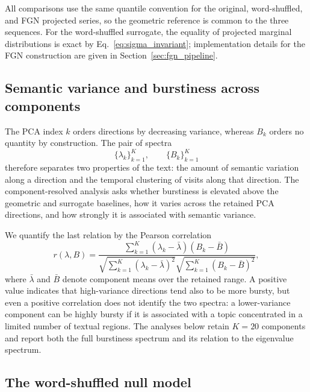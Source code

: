 \documentclass[12pt,a4paper]{article}
\begin{document}
All comparisons use the same quantile convention for the original,
word-shuffled, and FGN projected series, so the geometric reference is
common to the three sequences.
For the word-shuffled surrogate, the equality of projected marginal
distributions is exact by Eq.~\eqref{eq:sigma_invariant}; implementation
details for the FGN construction are given in
Section~\ref{sec:fgn_pipeline}.

\subsection{Semantic variance and burstiness across components}
\label{sec:component_structure}

The PCA index $k$ orders directions by decreasing variance, whereas
$B_k$ orders no quantity by construction.
The pair of spectra
\begin{equation}
  \{\lambda_k\}_{k=1}^K,
  \qquad
  \{B_k\}_{k=1}^K
  \label{eq:two_spectra}
\end{equation}
therefore separates two properties of the text: the amount of semantic
variation along a direction and the temporal clustering of visits along
that direction.
The component-resolved analysis asks whether burstiness is elevated
above the geometric and surrogate baselines, how it varies across the
retained PCA directions, and how strongly it is associated with
semantic variance.

We quantify the last relation by the Pearson correlation
\begin{equation}
  r(\lambda,B)=
  \frac{\sum_{k=1}^{K}(\lambda_k-\bar\lambda)(B_k-\bar B)}
  {\sqrt{\sum_{k=1}^{K}(\lambda_k-\bar\lambda)^2}
   \sqrt{\sum_{k=1}^{K}(B_k-\bar B)^2}},
  \label{eq:eigen_burst_corr}
\end{equation}
where $\bar\lambda$ and $\bar B$ denote component means over the retained
range.
A positive value indicates that high-variance directions tend also to
be more bursty, but even a positive correlation does not identify the
two spectra: a lower-variance component can be highly bursty if it is
associated with a topic concentrated in a limited number of textual
regions.
The analyses below retain $K=20$ components and report both the full
burstiness spectrum and its relation to the eigenvalue spectrum.

\subsection{The word-shuffled null model}
\label{sec:null_model_shuffle}
\end{document}
